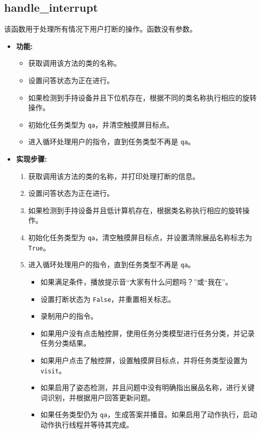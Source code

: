 \documentclass[]{article}
\begin{document}
\subsection{handle\_interrupt}
该函数用于处理所有情况下用户打断的操作。函数没有参数。

\begin{itemize}
	\item \textbf{功能:}
	\begin{itemize}
		\item 获取调用该方法的类的名称。
		\item 设置问答状态为正在进行。
		\item 如果检测到手持设备并且下位机存在，根据不同的类名称执行相应的旋转操作。
		\item 初始化任务类型为 \texttt{qa}，并清空触摸屏目标点。
		\item 进入循环处理用户的指令，直到任务类型不再是 \texttt{qa}。
	\end{itemize}
	\item \textbf{实现步骤:}
	\begin{enumerate}
		\item 获取调用该方法的类的名称，并打印处理打断的信息。
		\item 设置问答状态为正在进行。
		\item 如果检测到手持设备并且低计算机存在，根据类名称执行相应的旋转操作。
		\item 初始化任务类型为 \texttt{qa}，清空触摸屏目标点，并设置清除展品名称标志为 \texttt{True}。
		\item 进入循环处理用户的指令，直到任务类型不再是 \texttt{qa}。
		\begin{itemize}
			\item 如果满足条件，播放提示音“大家有什么问题吗？”或“我在”。
			\item 设置打断状态为 \texttt{False}，并重置相关标志。
			\item 录制用户的指令。
			\item 如果用户没有点击触控屏，使用任务分类模型进行任务分类，并记录任务分类结果。
			\item 如果用户点击了触控屏，设置触摸屏目标点，并将任务类型设置为 \texttt{visit}。
			\item 如果启用了姿态检测，并且问题中没有明确指出展品名称，进行关键词识别，并根据用户回答更新问题。
			\item 如果任务类型仍为 \texttt{qa}，生成答案并播音。如果启用了动作执行，启动动作执行线程并等待其完成。
		\end{itemize}
	\end{enumerate}

\end{itemize}
\end{document}
